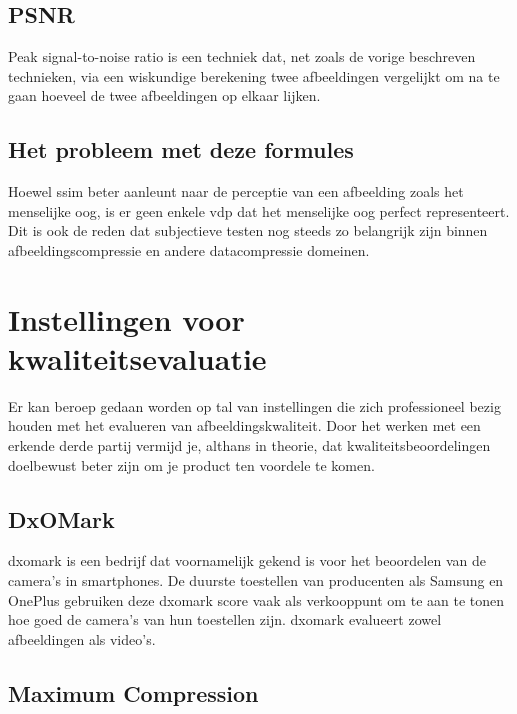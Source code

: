 \subsection{PSNR}
\label{sec:kwaliteit-psnr}

Peak signal-to-noise ratio is een techniek dat, net zoals de vorige beschreven technieken, via een wiskundige berekening twee afbeeldingen vergelijkt om na te gaan hoeveel de twee afbeeldingen op elkaar lijken.

\subsection{Het probleem met deze formules}
\label{sec:kwaliteit-tools-probleem}

Hoewel \gls{ssim} beter aanleunt naar de perceptie van een afbeelding zoals het menselijke oog, is er geen enkele \gls{vdp} dat het menselijke oog perfect representeert. Dit is ook de reden dat subjectieve testen nog steeds zo belangrijk zijn binnen \gls{afbeeldingscompressie} en andere \gls{datacompressie} domeinen.

\section{Instellingen voor kwaliteitsevaluatie}
\label{sec:kwaliteit-bedrijven}

Er kan beroep gedaan worden op tal van instellingen die zich professioneel bezig houden met het evalueren van afbeeldingskwaliteit. Door het werken met een erkende derde partij vermijd je, althans in theorie, dat kwaliteitsbeoordelingen doelbewust beter zijn om je product ten voordele te komen.

\subsection{DxOMark}
\label{sec:kwaliteit-dxomark}

\Gls{dxomark} is een bedrijf dat voornamelijk gekend is voor het beoordelen van de camera's in smartphones. De duurste toestellen van producenten als Samsung en OnePlus gebruiken deze \gls{dxomark} score vaak als verkooppunt om te aan te tonen hoe goed de camera's van hun toestellen zijn. \Gls{dxomark} evalueert zowel afbeeldingen als video's.

\subsection{Maximum Compression}
\label{sec:kwaliteit-maximum-compression}

